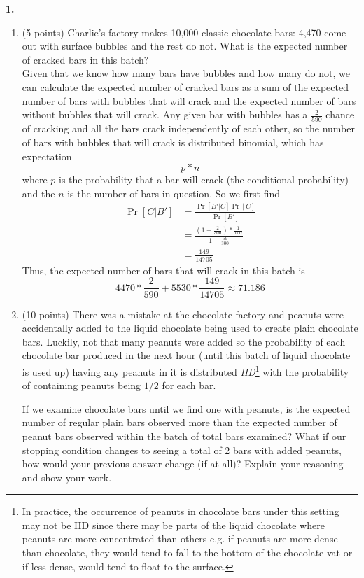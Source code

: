 \documentclass[12pt]{amsart}
\newenvironment{statement}[1]{\smallskip\noindent\color[rgb]{0.0,0.0,0.0} {\bf #1.}}{}
\theoremstyle{definition}
\theoremstyle{remark}
\newcommand{\1}{\mathds{1}}
\begin{document}
\begin{statement}{1}
\begin{enumerate}
    \item (5 points) Charlie's factory makes 10,000 classic chocolate bars: 4,470 come out with surface bubbles and the rest do not. What is the expected number of cracked bars in this batch?
    \\Given that we know how many bars have bubbles and how many do not, we can calculate the expected number of cracked bars as a sum of 
    the expected number of bars with bubbles that will crack and the expected number of bars without bubbles that will crack. Any given bar with bubbles has a 
    $\frac{2}{590}$ chance of cracking and all the bars crack independently of each other, so the number of bars with bubbles that will crack is distributed binomial, which 
    has expectation 
    $$
        p*n
    $$
    where $p$ is the probability that a bar will crack (the conditional probability) and the $n$ is the number of bars in question. So we first find 
    \begin{align*}
        \Pr{[C|B']} &= \frac{\Pr{[B'|C]}\Pr{[C]}}{\Pr{[B']}} \\ 
        &= \frac{(1 - \frac{2}{300}) * \frac{1}{100}}{1 - \frac{59}{300}} \\ 
        &= \frac{149}{14705}
    \end{align*}
    Thus, the expected number of bars that will crack in this batch is 
    $$
        4470*\frac{2}{590} + 5530*\frac{149}{14705} \approx 71.186
    $$

    \item (10 points) There was a mistake at the chocolate factory and peanuts were accidentally added to the liquid chocolate being used to create plain chocolate bars. Luckily, not that many peanuts were added so the probability of each chocolate bar produced in the next hour (until this batch of liquid chocolate is used up) having any peanuts in it is distributed \textit{IID}\footnote{In practice, the occurrence of peanuts in chocolate bars under this setting may not be IID since there may be parts of the liquid chocolate where peanuts are more concentrated than others e.g. if peanuts are more dense than chocolate, they would tend to fall to the bottom of the chocolate vat or if less dense, would tend to float to the surface.} with the probability of containing peanuts being $1/2$ for each bar. 
    
    \noindent If we examine chocolate bars until we find one with peanuts, is the expected number of regular plain bars observed more than the expected number of peanut bars observed within the batch of total bars examined? What if our stopping condition changes to seeing a total of 2 bars with added peanuts, how would your previous answer change (if at all)? Explain your reasoning and show your work.
    

\end{enumerate}
\end{statement}
\end{document}
